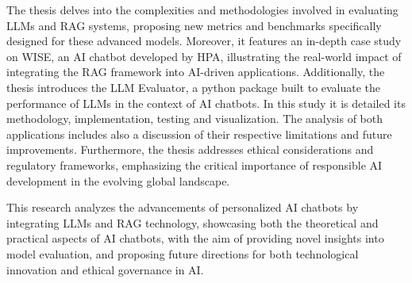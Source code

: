 The thesis delves into the complexities and methodologies involved in evaluating LLMs and RAG systems, proposing new metrics and benchmarks specifically designed for these advanced models. Moreover, it features an in-depth case study on WISE, an AI chatbot developed by HPA, illustrating the real-world impact of integrating the RAG framework into AI-driven applications. Additionally, the thesis introduces the LLM Evaluator, a python package built to evaluate the performance of LLMs in the context of AI chatbots. In this study it is detailed its methodology, implementation, testing and visualization. The analysis of both applications includes also a discussion of their respective limitations and future improvements. Furthermore, the thesis addresses ethical considerations and regulatory frameworks, emphasizing the critical importance of responsible AI development in the evolving global landscape.

This research analyzes the advancements of personalized AI chatbots by integrating LLMs and RAG technology, showcasing both the theoretical and practical aspects of AI chatbots, with the aim of providing novel insights into model evaluation, and proposing future directions for both technological innovation and ethical governance in AI.

\tableofcontents

\mainmatter

